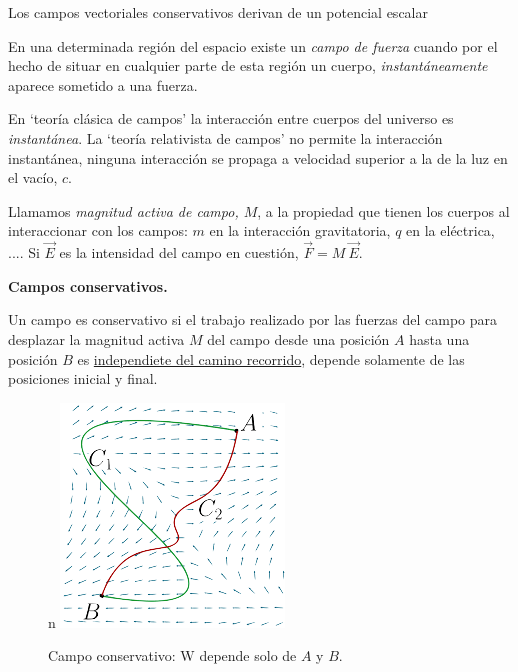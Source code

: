 \begin{small}
\begin{myexampleblock}{Los campos vectoriales conservativos derivan de un potencial escalar}	

\begin{scriptsize}
\vspace{2mm} En una determinada región del espacio existe un \emph{campo de fuerza} cuando por el hecho de situar en cualquier parte de esta región un cuerpo, \emph{instantáneamente} aparece sometido a una fuerza.

\vspace{2mm} En `teoría clásica de campos' la interacción entre cuerpos del universo es \emph{instantánea}. La `teoría relativista de campos'  no permite la interacción instantánea, ninguna interacción se propaga a velocidad superior a la de la luz en el vacío, $c$.

\vspace{2mm} Llamamos \emph{magnitud activa de campo, $M$}, a la propiedad que tienen los cuerpos al interaccionar con los campos: $m$ en la interacción gravitatoria, $q$ en la eléctrica, .... Si $\vec E$ es la intensidad del campo en cuestión, $\vec F=M\ \vec E$.
\end{scriptsize}

\vspace{2mm} \textbf{Campos conservativos.}

\begin{multicols}{2}
Un campo es conservativo si el trabajo realizado por las fuerzas del campo para desplazar la magnitud activa $M$ del campo desde una posición $A$ hasta una posición $B$ es \ul{independiete del camino recorrido}, depende solamente de las posiciones inicial y final.
\begin{figure}[H]n
		\centering
		\includegraphics[width=.25\textwidth]{imagenes/img02-11.png}
		\caption*{\scriptsize{Campo conservativo: W depende solo de $A$ y $B$}\normalsize{.}}
		\end{figure}
\end{multicols}


\end{myexampleblock}
\end{small}
